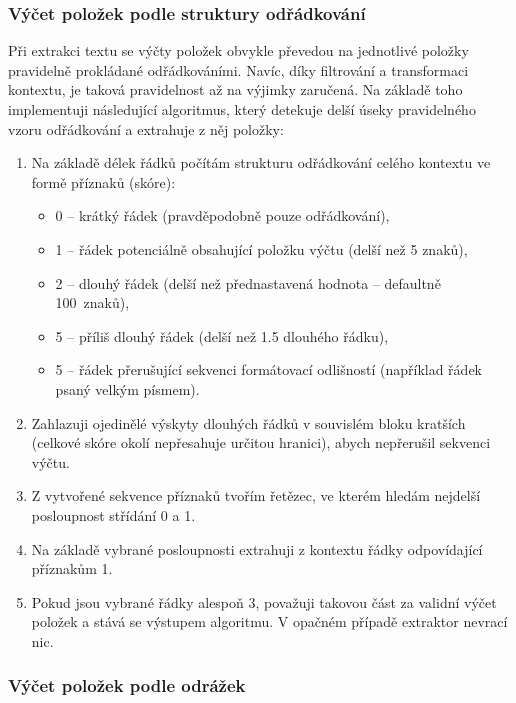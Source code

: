 \documentclass[thesis=M,czech]{FITthesis}[2019/12/23]
\begin{document}
\subsubsection{Výčet položek podle struktury odřádkování}
\label{sec:structure_item_enumeration_extractor}

Při extrakci textu se výčty položek obvykle převedou na jednotlivé položky pravidelně prokládané odřádkováními. Navíc, díky filtrování a transformaci kontextu, je taková pravidelnost až na výjimky zaručená. Na základě toho implementuji následující algoritmus, který detekuje delší úseky pravidelného vzoru odřádkování a extrahuje z něj položky:

\begin{enumerate}
    \item Na základě délek řádků počítám strukturu odřádkování celého kontextu ve formě příznaků (skóre):
        \begin{itemize}
            \item 0 -- krátký řádek (pravděpodobně pouze odřádkování),
            \item 1 -- řádek potenciálně obsahující položku výčtu (delší než 5 znaků),
            \item 2 -- dlouhý řádek (delší než přednastavená hodnota -- defaultně 100~znaků),
            \item 5 -- příliš dlouhý řádek (delší než 1.5 dlouhého řádku),
            \item 5 -- řádek přerušující sekvenci formátovací odlišností (například řádek psaný velkým písmem).
        \end{itemize}
    \item Zahlazuji ojedinělé výskyty dlouhých řádků v souvislém bloku kratších (celkové skóre okolí nepřesahuje určitou hranici), abych nepřerušil sekvenci výčtu.
    \item Z vytvořené sekvence příznaků tvořím řetězec, ve kterém hledám nejdelší posloupnost střídání 0 a 1.
    \item Na základě vybrané posloupnosti extrahuji z kontextu řádky odpovídající příznakům 1.
    \item Pokud jsou vybrané řádky alespoň 3, považuji takovou část za validní výčet položek a stává se výstupem algoritmu. V opačném případě extraktor nevrací nic.
\end{enumerate}

\subsubsection{Výčet položek podle odrážek}
\label{sec:char_item_enumeration_extractor}
\end{document}
